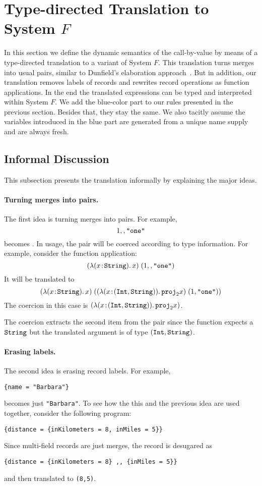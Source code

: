 \section{Type-directed Translation to System $ F $}

In this section we define the dynamic semantics of the call-by-value \name by
means of a type-directed translation to a variant of System $F$. This
translation turns merges into usual pairs, similar to Dunfield's elaboration
approach~\cite{dunfield2014elaborating}. But in addition, our translation
removes labels of records and rewrites record operations as function
applications. In the end the translated expressions can be typed and interpreted
within System $F$. We add the blue-color part to our rules presented in the
previous section. Besides that, they stay the same. We also tacitly assume the
variables introduced in the blue part are generated from a unique name supply and
are always fresh.

\subsection{Informal Discussion}

This subsection presents the translation informally by explaining the major
ideas. 

\paragraph{Turning merges into pairs.}
The first idea is turning merges into pairs. For example,
\[
1 ,, \texttt{"one"}
\]
becomes  {}.
In usage, the pair will be coerced according to type information. For example,
consider the function application:
\[
(\lambda (x \!:\! \texttt{String}).\, x) \; (1 ,, \texttt{"one"})
\]
It will be translated to
\[
(\lambda (x \!:\! \texttt{String}).\, x) \; ((\lambda (x \!:\! (\texttt{Int}, \texttt{String})).\, {\texttt{proj}}_{2} x) \; (1, \texttt{"one"}))
\]
The coercion in this case is $(\lambda (x \!:\! (\texttt{Int}, \texttt{String})).\, {\texttt{proj}}_{2} x)$.

\noindent The coercion extracts the second item from the pair since the function expects a $\texttt{String}$
but the translated argument is of type $(\texttt{Int}, \texttt{String})$. 

\paragraph{Erasing labels.}
The second idea is erasing record labels. For example,
\begin{lstlisting}
{name = "Barbara"}
\end{lstlisting}
becomes just \lstinline{"Barbara"}.
To see how the this and the previous idea are used together, consider the following program:
\begin{lstlisting}
{distance = {inKilometers = 8, inMiles = 5}}
\end{lstlisting}
Since multi-field records are just merges, the record is desugared as
\begin{lstlisting}
{distance = {inKilometers = 8} ,, {inMiles = 5}}
\end{lstlisting}
and then translated to \lstinline{(8,5)}.

